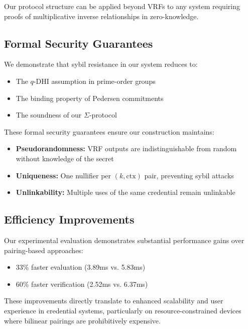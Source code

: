 Our protocol structure can be applied beyond VRFs to any system requiring proofs of multiplicative inverse relationships in zero-knowledge.

\subsection{Formal Security Guarantees}

We demonstrate that sybil resistance in our system reduces to:
\begin{itemize}
    \item The $q$-DHI assumption in prime-order groups
    \item The binding property of Pedersen commitments
    \item The soundness of our $\Sigma$-protocol
\end{itemize}

These formal security guarantees ensure our construction maintains:
\begin{itemize}
    \item \textbf{Pseudorandomness:} VRF outputs are indistinguishable from random without knowledge of the secret
    \item \textbf{Uniqueness:} One nullifier per $(k,\text{ctx})$ pair, preventing sybil attacks
    \item \textbf{Unlinkability:} Multiple uses of the same credential remain unlinkable
\end{itemize}

\subsection{Efficiency Improvements}

Our experimental evaluation demonstrates substantial performance gains over pairing-based approaches:
\begin{itemize}
    \item 33\% faster evaluation (3.89ms vs. 5.83ms)
    \item 60\% faster verification (2.52ms vs. 6.37ms)
\end{itemize}

These improvements directly translate to enhanced scalability and user experience in credential systems, particularly on resource-constrained devices where bilinear pairings are prohibitively expensive.












